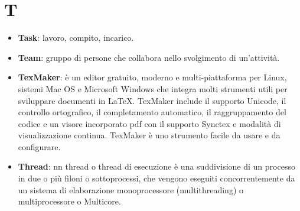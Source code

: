 \section{T}
\begin{itemize}
	\item
	\textbf{Task}: lavoro, compito, incarico.
	\item
	\textbf{Team}: gruppo di persone che collabora nello svolgimento di un'attività.
	\item
	\textbf{TexMaker}: è un editor gratuito, moderno e multi-piattaforma per Linux, sistemi Mac OS e Microsoft Windows che integra molti strumenti utili per sviluppare documenti in \LaTeX{}.
	TexMaker include il supporto Unicode, il controllo ortografico, il completamento automatico, il raggruppamento del codice e un visore incorporato pdf con il supporto Synctex e modalità di visualizzazione continua.
	TexMaker è uno strumento facile da usare e da configurare.
	\item
	\textbf{Thread}: nn thread o thread di esecuzione è una suddivisione di un processo in due o più filoni o sottoprocessi, che vengono eseguiti concorrentemente da un sistema di elaborazione monoprocessore (multithreading) o multiprocessore o Multicore.
	
\end{itemize}
